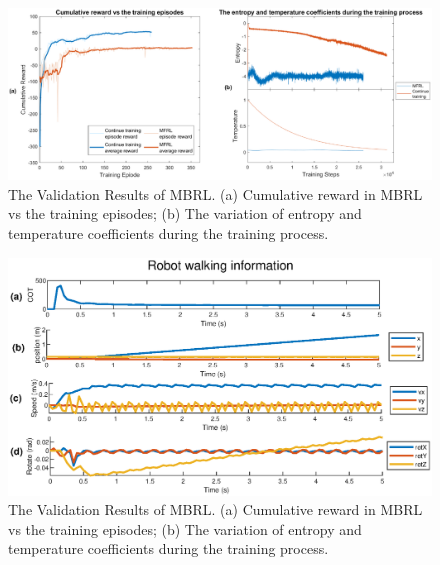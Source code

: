 \begin{figure}[htb]
    \centering
    \includegraphics[width=\linewidth]{img/chap5/MFRLvsCT.eps}
    \caption{The Validation Results of MBRL. (a) Cumulative reward in MBRL vs the training episodes; (b) The variation of entropy and temperature coefficients during the training process.}
    \label{fig:MFRLvsCT}
\end{figure}

\begin{figure}[htb]
    \centering
    \includegraphics[width=0.9\linewidth]{img/chap5/best_CL.eps}
    \caption{The Validation Results of MBRL. (a) Cumulative reward in MBRL vs the training episodes; (b) The variation of entropy and temperature coefficients during the training process.}
    \label{fig:CT}
\end{figure}

